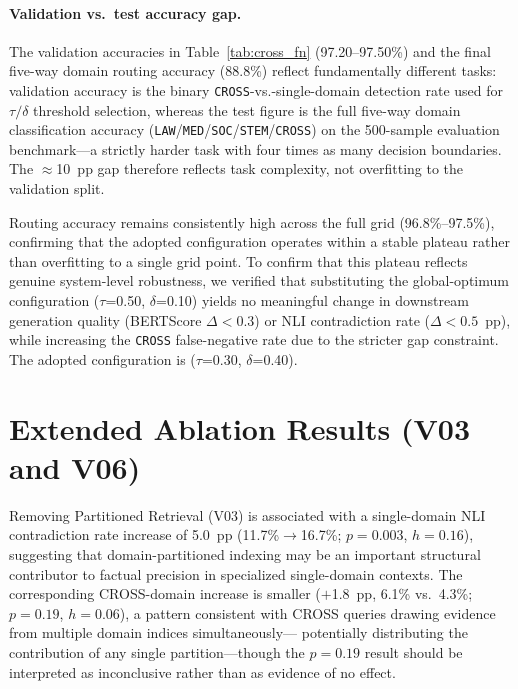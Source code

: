 \documentclass[a4paper,fleql,doubleblind]{cas-sc}
\begin{document}
\paragraph{Validation vs.\ test accuracy gap.}
The validation accuracies in Table~\ref{tab:cross_fn} (97.20--97.50\%) and the
final five-way domain routing accuracy (88.8\%) reflect
fundamentally different tasks: validation accuracy is the binary
\texttt{CROSS}-vs.-single-domain detection rate used for $\tau/\delta$ threshold
selection, whereas the test figure is the full five-way domain classification accuracy
(\texttt{LAW}/\texttt{MED}/\texttt{SOC}/\texttt{STEM}/\texttt{CROSS}) on the
500-sample evaluation benchmark---a strictly harder task with four times as many
decision boundaries. The $\approx$10~pp gap therefore reflects task complexity,
not overfitting to the validation split.

Routing accuracy remains consistently high across the full grid
(96.8\%--97.5\%), confirming that the adopted configuration operates within
a stable plateau rather than overfitting to a single grid point. To confirm
that this plateau reflects genuine system-level robustness, we verified that
substituting the global-optimum configuration ($\tau$=0.50, $\delta$=0.10)
yields no meaningful change in downstream generation quality
(BERTScore $\Delta < 0.3$) or NLI contradiction rate ($\Delta < 0.5$~pp),
while increasing the \texttt{CROSS} false-negative rate due to the stricter
gap constraint. The adopted configuration is ($\tau$=0.30, $\delta$=0.40).

\section{Extended Ablation Results (V03 and V06)}
\label{supp:ablation}

Removing Partitioned Retrieval (V03) is associated with a single-domain
NLI contradiction rate increase of 5.0~pp (11.7\%$\to$16.7\%; $p{=}0.003$,
$h{=}0.16$), suggesting that domain-partitioned indexing may be an important
structural contributor to factual precision in specialized single-domain
contexts. The corresponding CROSS-domain increase is smaller ($+$1.8~pp,
6.1\% vs.\ 4.3\%; $p{=}0.19$, $h{=}0.06$), a pattern consistent with
CROSS queries drawing evidence from multiple domain indices simultaneously---
potentially distributing the contribution of any single partition---though the
$p{=}0.19$ result should be interpreted as inconclusive rather than as
evidence of no effect.
\end{document}
